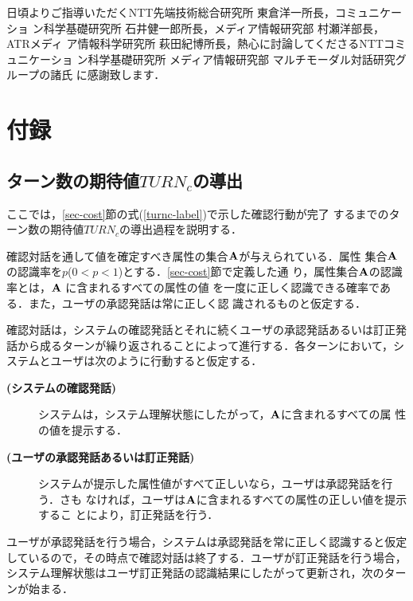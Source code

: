 \acknowledgment

日頃よりご指導いただくNTT先端技術総合研究所 東倉洋一所長，コミュニケーショ
ン科学基礎研究所 石井健一郎所長，メディア情報研究部 村瀬洋部長，ATRメディ
ア情報科学研究所 萩田紀博所長，熱心に討論してくださるNTTコミュニケーショ
ン科学基礎研究所 メディア情報研究部 マルチモーダル対話研究グループの諸氏
に感謝致します．







\section*{付録}

\subsection*{ターン数の期待値$TURN_{c}$の導出}

ここでは，\ref{sec-cost}節の式(\ref{turnc-label})で示した確認行動が完了
するまでのターン数の期待値$TURN_{c}$の導出過程を説明する．

確認対話を通して値を確定すべき属性の集合${\bf A}$が与えられている．属性
集合${\bf A}$の認識率を$p$($0<p<1$)とする．\ref{sec-cost}節で定義した通
り，属性集合${\bf A}$の認識率とは，${\bf A}$ に含まれるすべての属性の値
を一度に正しく認識できる確率である．また，ユーザの承認発話は常に正しく認
識されるものと仮定する．

確認対話は，システムの確認発話とそれに続くユーザの承認発話あるいは訂正発
話から成るターンが繰り返されることによって進行する．各ターンにおいて，シ
ステムとユーザは次のように行動すると仮定する．

\begin{description}
\item[\bf (システムの確認発話)]
システムは，システム理解状態にしたがって，${\bf A}$に含まれるすべての属
性の値を提示する．

\item[\bf (ユーザの承認発話あるいは訂正発話)]
システムが提示した属性値がすべて正しいなら，ユーザは承認発話を行う．さも
なければ，ユーザは${\bf A}$に含まれるすべての属性の正しい値を提示するこ
とにより，訂正発話を行う．
\end{description}




ユーザが承認発話を行う場合，システムは承認発話を常に正しく認識すると仮定
しているので，その時点で確認対話は終了する．ユーザが訂正発話を行う場合，
システム理解状態はユーザ訂正発話の認識結果にしたがって更新され，次のター
ンが始まる．

